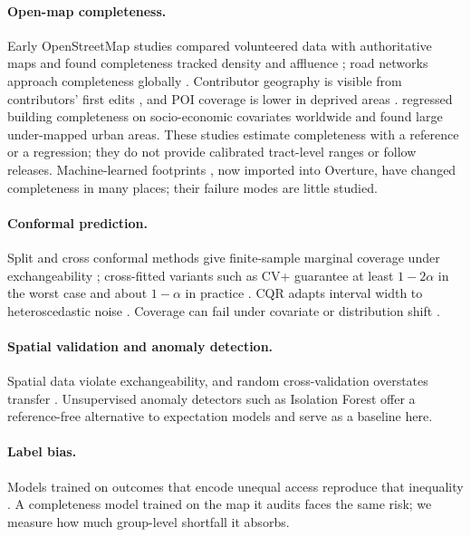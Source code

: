 \documentclass[11pt]{article}
\begin{document}
\paragraph{Open-map completeness.} Early OpenStreetMap studies compared volunteered data with authoritative maps and found completeness tracked density and affluence \citep{haklay2010}; road networks approach completeness globally \citep{barringtonleigh2017}. Contributor geography is visible from contributors' first edits \citep{thebaultspieker2018}, and POI coverage is lower in deprived areas \citep{mashhadi2013}. \citet{herfort2023} regressed building completeness on socio-economic covariates worldwide and found large under-mapped urban areas. These studies estimate completeness with a reference or a regression; they do not provide calibrated tract-level ranges or follow releases. Machine-learned footprints \citep{msbuildings}, now imported into Overture, have changed completeness in many places; their failure modes are little studied.

\paragraph{Conformal prediction.} Split and cross conformal methods give finite-sample marginal coverage under exchangeability \citep{vovk2005,lei2018}; cross-fitted variants such as CV+ guarantee at least $1-2\alpha$ in the worst case and about $1-\alpha$ in practice \citep{barber2021}. CQR adapts interval width to heteroscedastic noise \citep{romano2019}. Coverage can fail under covariate or distribution shift \citep{tibshirani2019,gibbs2021}.

\paragraph{Spatial validation and anomaly detection.} Spatial data violate exchangeability, and random cross-validation overstates transfer \citep{roberts2017,ploton2020}. Unsupervised anomaly detectors such as Isolation Forest \citep{liu2008} offer a reference-free alternative to expectation models and serve as a baseline here.

\paragraph{Label bias.} Models trained on outcomes that encode unequal access reproduce that inequality \citep{obermeyer2019}. A completeness model trained on the map it audits faces the same risk; we measure how much group-level shortfall it absorbs.
\end{document}
